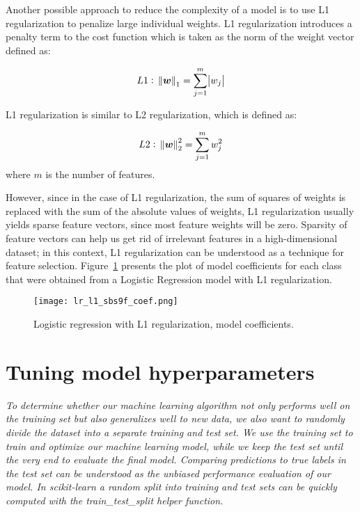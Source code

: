 Another possible approach to reduce the complexity of a model is to use L1 regularization to penalize large individual weights.
L1 regularization introduces a penalty term to the cost function which is taken as the norm of the weight vector defined as:

\begin{equation} \label{eq:l1_regularization}
    L1:~\norm{\boldsymbol{w}}_1 = \sum \limits_{j=1}^m \abs{w_j}
\end{equation}

L1 regularization is similar to L2 regularization, which is defined as:

\begin{equation} \label{eq:l2_regularization}
    L2:~\norm{\boldsymbol{w}}_2^2 = \sum \limits_{j=1}^m w_j^2
\end{equation}
where $m$ is the number of features.

However, since in the case of L1 regularization, the sum of squares of weights is replaced with the sum of the absolute values of weights, L1 regularization usually yields sparse feature vectors, since most feature weights will be zero\cite{RaschkaMirjalili2017,Scikit-learndevelopers2019}.
Sparsity of feature vectors can help us get rid of irrelevant features in a high-dimensional dataset;
in this context, L1 regularization can be understood as a technique for feature selection\cite{RaschkaMirjalili2017}.
Figure~\ref{fig:lr_l1_sbs9f_coef} presents the plot of model coefficients for each class that were obtained from a Logistic Regression model with L1 regularization.

\begin{figure}[hbt!]
    \centering
    \texttt{[image: lr\_l1\_sbs9f\_coef.png]}
    \caption{Logistic regression with L1 regularization, model coefficients.}
    \label{fig:lr_l1_sbs9f_coef}
\end{figure}

\section{Tuning model hyperparameters} \label{sec:tuning_hyperparameters}

\textit{To determine whether our machine learning algorithm not only performs well on the training set but also generalizes well to new data, we also want to randomly divide the dataset into a separate training and test set. We use the training set to train and optimize our machine learning model, while we keep the test set until the very end to evaluate the final model. Comparing predictions to true labels in the test set can be understood as the unbiased performance evaluation of our model. In scikit-learn a random split into training and test sets can be quickly computed with the train\_test\_split helper function.}\cite{RaschkaMirjalili2017}

